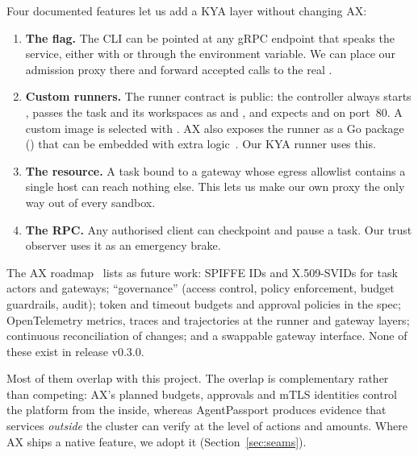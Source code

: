 Four documented features let us add a KYA layer without changing AX:

\begin{enumerate}
  \item \textbf{The  flag.} The CLI can be pointed at any gRPC endpoint that speaks the  service, either with  or through the  environment variable. We can place our admission proxy there and forward accepted calls to the real .
  \item \textbf{Custom runners.} The runner contract is public: the controller always starts , passes the task and its workspaces as  and , and expects  and  on port~80. A custom image is selected with . AX also exposes the runner as a Go package () that can be embedded with extra logic~\cite{ax-runner}. Our KYA runner uses this.
  \item \textbf{The  resource.} A task bound to a gateway whose egress allowlist contains a single host can reach nothing else. This lets us make our own proxy the only way out of every sandbox.
  \item \textbf{The  RPC.} Any authorised client can checkpoint and pause a task. Our trust observer uses it as an emergency brake.
\end{enumerate}

\begin{warnbox}
The AX roadmap~\cite{ax-roadmap} lists as future work: SPIFFE IDs and X.509-SVIDs for task actors and gateways; ``governance'' (access control, policy enforcement, budget guardrails, audit); token and timeout budgets and approval policies in the  spec; OpenTelemetry metrics, traces and trajectories at the runner and gateway layers; continuous reconciliation of  changes; and a swappable gateway interface. None of these exist in release v0.3.0.

Most of them overlap with this project. The overlap is complementary rather than competing: AX's planned budgets, approvals and mTLS identities control the platform from the inside, whereas AgentPassport produces evidence that services \emph{outside} the cluster can verify at the level of actions and amounts. Where AX ships a native feature, we adopt it (Section~\ref{sec:seams}).
\end{warnbox}

